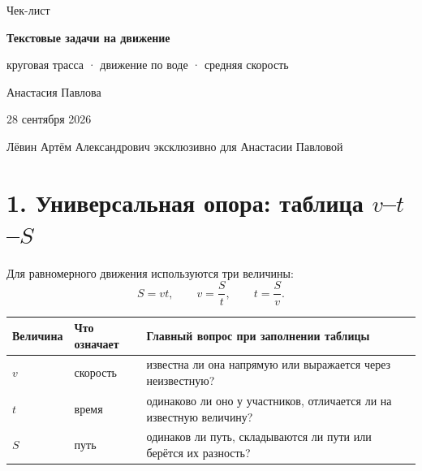 \documentclass[a4paper,12pt]{article}
\newcommand{\vts}{\(v\)--\(t\)--\(S\)}
\begin{document}
\thispagestyle{empty}
\begin{center}
\vspace*{18mm}
{\color{accent}\Large Чек-лист}\par
\vspace{5mm}
{\Huge\bfseries Текстовые задачи на движение}\par
\vspace{3mm}
{\Large круговая трасса · движение по воде · средняя скорость}\par
\vspace{12mm}
{\large Анастасия Павлова}\par
\vspace{3mm}
{\normalsize 28 сентября 2026}\par
\vfill
{\small Лёвин Артём Александрович эксклюзивно для Анастасии Павловой}\par
\vspace{9mm}
\end{center}
\clearpage

\section*{1. Универсальная опора: таблица \vts}

Для равномерного движения используются три величины:
\[
S=vt,\qquad v=\frac{S}{t},\qquad t=\frac{S}{v}.
\]

\begin{tabularx}{\linewidth}{@{}lXX@{}}
\toprule
\textbf{Величина} & \textbf{Что означает} & \textbf{Главный вопрос при заполнении таблицы} \\
\midrule
\(v\) & скорость & известна ли она напрямую или выражается через неизвестную? \\
\(t\) & время & одинаково ли оно у участников, отличается ли на известную величину? \\
\(S\) & путь & одинаков ли путь, складываются ли пути или берётся их разность? \\
\bottomrule
\end{tabularx}
\end{document}
